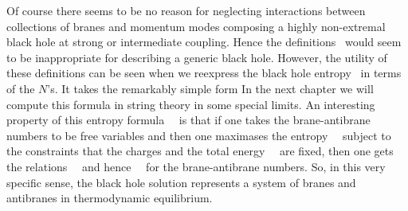 Of course there seems to be no reason for neglecting interactions
between collections of branes and momentum modes
composing a highly non-extremal black hole at strong or intermediate
coupling. Hence
the definitions \dbranes\ would seem to be inappropriate for
describing a generic black hole.
However, the utility of these definitions can be seen when we
reexpress the black hole entropy \entropy\ in terms of the $N$'s.
It takes the remarkably simple form
 \eqn{}
In the next chapter we will compute this formula in string
theory in  some special limits. An interesting property of this 
entropy formula \smira\ ~is that if one takes the brane-antibrane
numbers to be free variables and then one maximases the entropy
\smira\ ~subject to the constraints that the charges and the 
 total energy
 \energybr\ ~are fixed, then one gets the relations 
\forlen \forvol\ ~and hence \dbranes\ ~for the brane-antibrane
numbers. So, in this very specific  sense, 
the black hole solution represents
a system of branes and antibranes in thermodynamic equilibrium. 


